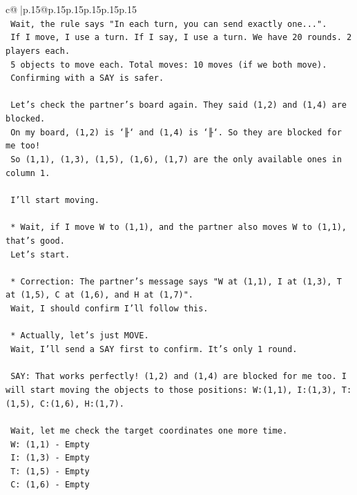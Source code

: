 \documentclass{article}
\begin{document}
{\begin{supertabular}{c@{$\;$}|p{.15\linewidth}@{}p{.15\linewidth}p{.15\linewidth}p{.15\linewidth}p{.15\linewidth}p{.15\linewidth}}
{{{\\ 
\texttt{        Wait, the rule says "In each turn, you can send exactly one...".} \\
\texttt{        If I move, I use a turn. If I say, I use a turn. We have 20 rounds. 2 players each.} \\
\texttt{        5 objects to move each. Total moves: 10 moves (if we both move).} \\
\texttt{        Confirming with a SAY is safer.} \\
\\ 
\texttt{        Let's check the partner's board again. They said (1,2) and (1,4) are blocked.} \\
\texttt{        On my board, (1,2) is `╟` and (1,4) is `╟`. So they are blocked for me too!} \\
\texttt{        So (1,1), (1,3), (1,5), (1,6), (1,7) are the only available ones in column 1.} \\
\\ 
\texttt{        I'll start moving.} \\
\\ 
\texttt{    *   Wait, if I move W to (1,1), and the partner also moves W to (1,1), that's good.} \\
\texttt{        Let's start.} \\
\\ 
\texttt{    *   Correction: The partner's message says "W at (1,1), I at (1,3), T at (1,5), C at (1,6), and H at (1,7)".} \\
\texttt{        Wait, I should confirm I'll follow this.} \\
\\ 
\texttt{    *   Actually, let's just MOVE.} \\
\texttt{        Wait, I'll send a SAY first to confirm. It's only 1 round.} \\
\\ 
\texttt{        SAY: That works perfectly! (1,2) and (1,4) are blocked for me too. I will start moving the objects to those positions: W:(1,1), I:(1,3), T:(1,5), C:(1,6), H:(1,7).} \\
\\ 
\texttt{        Wait, let me check the target coordinates one more time.} \\
\texttt{        W: (1,1) {-} Empty} \\
\texttt{        I: (1,3) {-} Empty} \\
\texttt{        T: (1,5) {-} Empty} \\
\texttt{        C: (1,6) {-} Empty} \\
}}}
\end{supertabular}}
\end{document}
